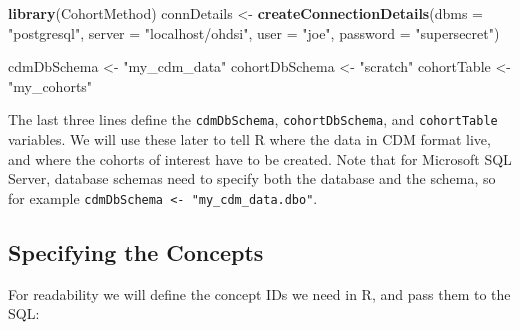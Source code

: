 \documentclass[11pt]{book}
\newenvironment{Shaded}{\begin{snugshade}}{\end{snugshade}}
\newcommand{\KeywordTok}[1]{\textcolor[rgb]{0.13,0.29,0.53}{\textbf{#1}}}
\newcommand{\DataTypeTok}[1]{\textcolor[rgb]{0.13,0.29,0.53}{#1}}
\newcommand{\StringTok}[1]{\textcolor[rgb]{0.31,0.60,0.02}{#1}}
\newcommand{\NormalTok}[1]{#1}
\theoremstyle{definition}
\theoremstyle{definition}
\theoremstyle{definition}
\theoremstyle{remark}
\begin{document}
\begin{Shaded}
\begin{Highlighting}[]
\KeywordTok{library}\NormalTok{(CohortMethod)}
\NormalTok{connDetails <-}\StringTok{ }\KeywordTok{createConnectionDetails}\NormalTok{(}\DataTypeTok{dbms =} \StringTok{"postgresql"}\NormalTok{,}
                                       \DataTypeTok{server =} \StringTok{"localhost/ohdsi"}\NormalTok{,}
                                       \DataTypeTok{user =} \StringTok{"joe"}\NormalTok{,}
                                       \DataTypeTok{password =} \StringTok{"supersecret"}\NormalTok{)}

\NormalTok{cdmDbSchema <-}\StringTok{ "my_cdm_data"}
\NormalTok{cohortDbSchema <-}\StringTok{ "scratch"}
\NormalTok{cohortTable <-}\StringTok{ "my_cohorts"}
\end{Highlighting}
\end{Shaded}

The last three lines define the \texttt{cdmDbSchema},
\texttt{cohortDbSchema}, and \texttt{cohortTable} variables. We will use
these later to tell R where the data in CDM format live, and where the
cohorts of interest have to be created. Note that for Microsoft SQL
Server, database schemas need to specify both the database and the
schema, so for example
\texttt{cdmDbSchema\ \textless{}-\ "my\_cdm\_data.dbo"}.

\subsection{Specifying the Concepts}\label{specifying-the-concepts}

For readability we will define the concept IDs we need in R, and pass
them to the SQL:
\end{document}
